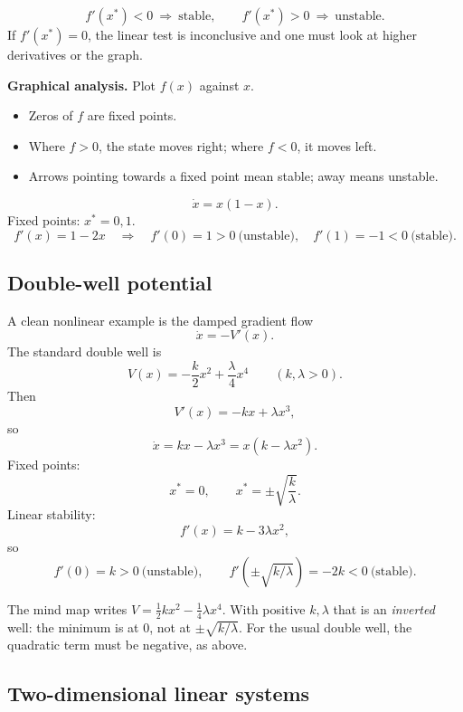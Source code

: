\documentclass[10.5pt,a4paper]{article}
\begin{document}
\begin{keybox}
\[
\boxed{f'(x^*)<0\ \Longrightarrow\ \text{stable},\qquad
f'(x^*)>0\ \Longrightarrow\ \text{unstable}.}
\]
If \(f'(x^*)=0\), the linear test is inconclusive and one must look at
higher derivatives or the graph.
\end{keybox}

\textbf{Graphical analysis.} Plot \(f(x)\) against \(x\).
\begin{itemize}
\item Zeros of \(f\) are fixed points.
\item Where \(f>0\), the state moves right; where \(f<0\), it moves left.
\item Arrows pointing towards a fixed point mean stable; away means unstable.
\end{itemize}

\begin{keybox}
\[
\dot x=x(1-x).
\]
Fixed points: \(x^*=0,1\).
\[
f'(x)=1-2x
\quad\Longrightarrow\quad
f'(0)=1>0\ \text{(unstable)},\quad
f'(1)=-1<0\ \text{(stable)}.
\]
\end{keybox}

\subsection{Double-well potential}

A clean nonlinear example is the damped gradient flow
\[
\dot x=-V'(x).
\]
The standard double well is
\[
V(x)=-\frac{k}{2}x^2+\frac{\lambda}{4}x^4
\qquad(k,\lambda>0).
\]
Then
\[
V'(x)=-kx+\lambda x^3,
\]
so
\[
\dot x=kx-\lambda x^3=x(k-\lambda x^2).
\]
Fixed points:
\[
x^*=0,\qquad x^*=\pm\sqrt{\frac{k}{\lambda}}.
\]
Linear stability:
\[
f'(x)=k-3\lambda x^2,
\]
so
\[
f'(0)=k>0\ \text{(unstable)},\qquad
f'\!\left(\pm\sqrt{k/\lambda}\right)=-2k<0\ \text{(stable)}.
\]

\begin{warnbox}
The mind map writes \(V=\frac12kx^2-\frac14\lambda x^4\). With positive
\(k,\lambda\) that is an \emph{inverted} well: the minimum is at \(0\),
not at \(\pm\sqrt{k/\lambda}\). For the usual double well, the quadratic
term must be negative, as above.
\end{warnbox}

\subsection{Two-dimensional linear systems}
\end{document}
